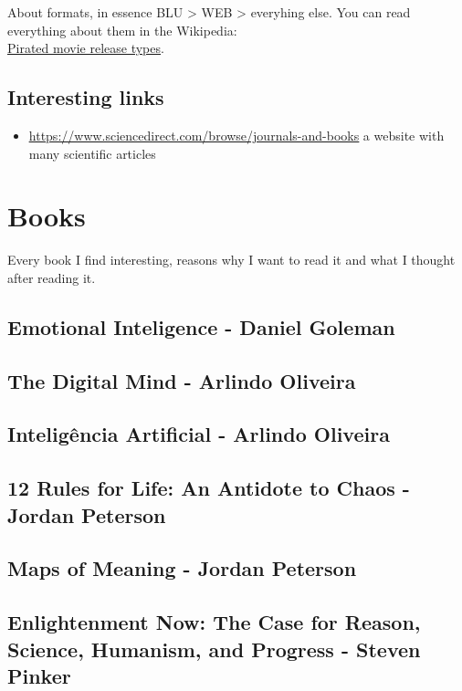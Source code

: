 About formats, in essence BLU > WEB > everyhing else. You can read everything about them in the Wikipedia:\\ \href{https://en.wikipedia.org/wiki/Pirated_movie_release_types}{\uline{Pirated movie release types}}.



\subsection{Interesting links}

\begin{itemize}
    \item \href{https://www.sciencedirect.com/browse/journals-and-books}{\ul{https://www.sciencedirect.com/browse/journals-and-books}} a website with many scientific articles
\end{itemize}


\section{Books}
\par Every book I find interesting, reasons why I want to read it and what I thought after reading it.

\subsection{Emotional Inteligence - Daniel Goleman}

\subsection{The Digital Mind - Arlindo Oliveira}

\subsection{Inteligência Artificial - Arlindo Oliveira}

\subsection{12 Rules for Life: An Antidote to Chaos - Jordan Peterson}

\subsection{Maps of Meaning - Jordan Peterson}

\subsection{Enlightenment Now: The Case for Reason, Science, Humanism, and Progress - Steven Pinker}

